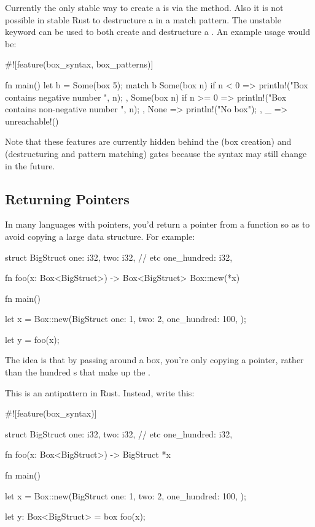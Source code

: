 Currently the only stable way to create a  is via the  method. Also it is not possible in stable 
Rust to destructure a  in a match pattern. The unstable  keyword can be used to both create and destructure a 
. An example usage would be:

\begin{rustc}
#![feature(box_syntax, box_patterns)]

fn main() {
    let b = Some(box 5);
    match b {
        Some(box n) if n < 0 => {
            println!("Box contains negative number {}", n);
        },
        Some(box n) if n >= 0 => {
            println!("Box contains non-negative number {}", n);
        },
        None => {
            println!("No box");
        },
        _ => unreachable!()
    }
}
\end{rustc}

Note that these features are currently hidden behind the  (box creation) and  
(destructuring and pattern matching) gates because the syntax may still change in the future.

\subsection*{Returning Pointers}

In many languages with pointers, you'd return a pointer from a function so as to avoid copying a large data structure. 
For example:

\begin{rustc}
struct BigStruct {
    one: i32,
    two: i32,
    // etc
    one_hundred: i32,
}

fn foo(x: Box<BigStruct>) -> Box<BigStruct> {
    Box::new(*x)
}

fn main() {
    let x = Box::new(BigStruct {
        one: 1,
        two: 2,
        one_hundred: 100,
    });

    let y = foo(x);
}
\end{rustc}

The idea is that by passing around a box, you're only copying a pointer, rather than the hundred \itt s that make up the .

\blank

This is an antipattern in Rust. Instead, write this:

\begin{rustc}
#![feature(box_syntax)]

struct BigStruct {
    one: i32,
    two: i32,
    // etc
    one_hundred: i32,
}

fn foo(x: Box<BigStruct>) -> BigStruct {
    *x
}

fn main() {
    let x = Box::new(BigStruct {
        one: 1,
        two: 2,
        one_hundred: 100,
    });

    let y: Box<BigStruct> = box foo(x);
}
\end{rustc}

